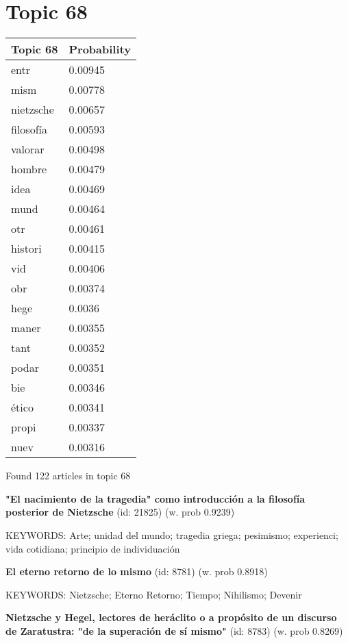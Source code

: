 \documentclass{article}
\begin{document}
\vfill
\newpage


\centering
\thispagestyle{empty}
\section*{Topic 68}\vfill
\begin{tabular}{ll}
\toprule
  Topic 68 & Probability \\
\midrule
      entr &     0.00945 \\
      mism &     0.00778 \\
 nietzsche &     0.00657 \\
 filosofía &     0.00593 \\
   valorar &     0.00498 \\
    hombre &     0.00479 \\
      idea &     0.00469 \\
      mund &     0.00464 \\
       otr &     0.00461 \\
   histori &     0.00415 \\
       vid &     0.00406 \\
       obr &     0.00374 \\
      hege &      0.0036 \\
     maner &     0.00355 \\
      tant &     0.00352 \\
     podar &     0.00351 \\
       bie &     0.00346 \\
     ético &     0.00341 \\
     propi &     0.00337 \\
      nuev &     0.00316 \\
\bottomrule
\end{tabular}

\vfill
Found 122 articles in topic 68
\vfill

\textbf{"El nacimiento de la tragedia" como introducción a la filosofía posterior de Nietzsche} (id: 21825)
 (w. prob 0.9239)


KEYWORDS:
Arte; unidad del mundo; tragedia griega; pesimismo; experienci; vida cotidiana; principio de individuación
\vfill

\textbf{El eterno retorno de lo mismo} (id: 8781)
 (w. prob 0.8918)


KEYWORDS:
Nietzsche; Eterno Retorno; Tiempo; Nihilismo; Devenir
\vfill

\textbf{Nietzsche y Hegel, lectores de heráclito o a propósito de un discurso de Zaratustra: "de la superación de sí mismo"} (id: 8783)
 (w. prob 0.8269)
\end{document}
